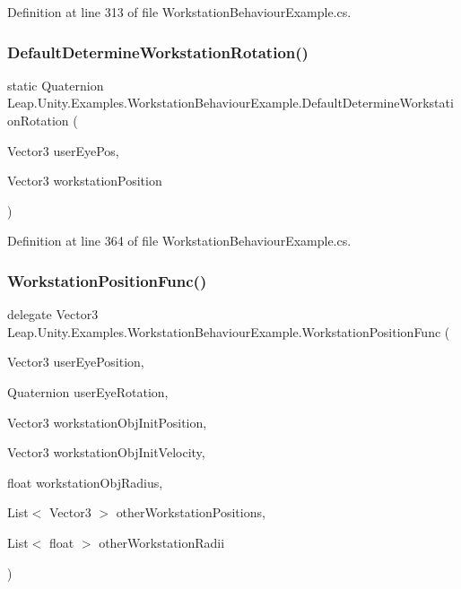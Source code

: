 Definition at line 313 of file Workstation\+Behaviour\+Example.\+cs.

\mbox{\label{class_leap_1_1_unity_1_1_examples_1_1_workstation_behaviour_example_a608204dd046521635b6b3fa83b63d734}} 
\subsubsection{\texorpdfstring{DefaultDetermineWorkstationRotation()}{DefaultDetermineWorkstationRotation()}}
{\footnotesize\ttfamily static Quaternion Leap.\+Unity.\+Examples.\+Workstation\+Behaviour\+Example.\+Default\+Determine\+Workstation\+Rotation (\begin{DoxyParamCaption}\item[{Vector3}]{user\+Eye\+Pos,  }\item[{Vector3}]{workstation\+Position }\end{DoxyParamCaption})\hspace{0.3cm}{\ttfamily [static]}}



Definition at line 364 of file Workstation\+Behaviour\+Example.\+cs.

\mbox{\label{class_leap_1_1_unity_1_1_examples_1_1_workstation_behaviour_example_aa1eb03a23e58150cbb75aee152bb4d33}} 
\subsubsection{\texorpdfstring{WorkstationPositionFunc()}{WorkstationPositionFunc()}}
{\footnotesize\ttfamily delegate Vector3 Leap.\+Unity.\+Examples.\+Workstation\+Behaviour\+Example.\+Workstation\+Position\+Func (\begin{DoxyParamCaption}\item[{Vector3}]{user\+Eye\+Position,  }\item[{Quaternion}]{user\+Eye\+Rotation,  }\item[{Vector3}]{workstation\+Obj\+Init\+Position,  }\item[{Vector3}]{workstation\+Obj\+Init\+Velocity,  }\item[{float}]{workstation\+Obj\+Radius,  }\item[{List$<$ Vector3 $>$}]{other\+Workstation\+Positions,  }\item[{List$<$ float $>$}]{other\+Workstation\+Radii }\end{DoxyParamCaption})}

